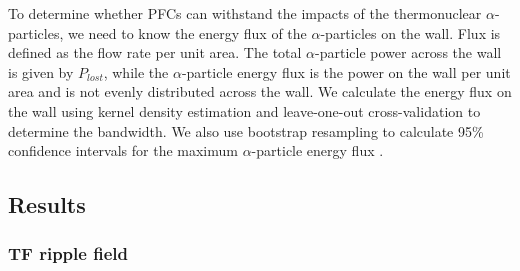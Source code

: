 \documentclass[10pt, a4paper, twoside]{article}
\begin{document}
To determine whether PFCs can withstand the impacts of the thermonuclear $\alpha$-particles, we need to know the energy flux of the $\alpha$-particles on the wall. Flux is defined as the flow rate per unit area. The total $\alpha$-particle power across the wall is given by $P_{lost}$, while the $\alpha$-particle energy flux is the power on the wall per unit area and is not evenly distributed across the wall. We calculate the energy flux on the wall using kernel density estimation \cite{chen2017} and leave-one-out cross-validation \cite{chen2017} to determine the bandwidth. We also use bootstrap resampling to calculate 95\% confidence intervals for the maximum $\alpha$-particle energy flux \cite{chen2017}.


\subsection{Results}

\subsubsection{TF ripple field}
\label{sec:tf_ripple_field}
\end{document}
